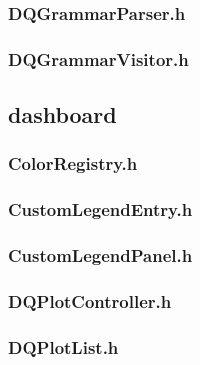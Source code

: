 \subsubsection*{DQGrammarParser.h}


\subsubsection*{DQGrammarVisitor.h}


\subsection*{dashboard}

\subsubsection*{ColorRegistry.h}


\subsubsection*{CustomLegendEntry.h}


\subsubsection*{CustomLegendPanel.h}


\subsubsection*{DQPlotController.h}


\subsubsection*{DQPlotList.h}


